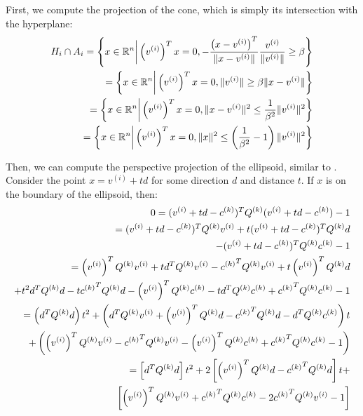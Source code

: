 First, we compute the projection of the cone, which is simply its intersection with the hyperplane:
\begin{align*}
H_i \cap A_i 
= \left\{x \in \mathbb R^n \bigg| \left(v^{(i)}\right)^Tx = 0, -\frac{\left(x - v^{(i)}\right)^T}{\|x - v^{(i)}\|}\frac{v^{(i)}}{\|v^{(i)}\|}\ge \beta \right\} \\
= \left\{x \in \mathbb R^n \bigg| \left(v^{(i)}\right)^Tx = 0, \|v^{(i)}\|\ge \beta\|x - v^{(i)}\| \right\} \\
= \left\{x \in \mathbb R^n \bigg| \left(v^{(i)}\right)^Tx = 0, \|x - v^{(i)}\|^2 \le \frac 1 {\beta^2}\|v^{(i)}\|^2 \right\} \\
= \left\{x \in \mathbb R^n \bigg| \left(v^{(i)}\right)^Tx = 0, \|x\|^2 \le \left(\frac 1 {\beta^2} - 1\right)\|v^{(i)}\|^2 \right\} \\
\end{align*}

Then, we can compute the perspective projection of the ellipsoid, similar to \cite{eberly_2013}.
Consider the point $x = v^{(i)} + td$ for some direction $d$ and distance $t$.
If $x$ is on the boundary of the ellipsoid, then:
\begin{align*}
0 = (v^{(i)} + t d - {c^{(k)}} )^T {Q^{(k)}}  (v^{(i)} + t d - {c^{(k)}} ) - 1\\
= (v^{(i)} + t d - {c^{(k)}} )^T {Q^{(k)}}  v^{(i)} + t (v^{(i)} + t d - {c^{(k)}} )^T {Q^{(k)}} d \\ - (v^{(i)} + t d - {c^{(k)}} )^T {Q^{(k)}} {c^{(k)}} - 1\\
= \left(v^{(i)}\right)^T {Q^{(k)}}  v^{(i)} + t d^T {Q^{(k)}}  v^{(i)} - {c^{(k)}} ^T {Q^{(k)}}  v^{(i)} + t \left(v^{(i)}\right)^T {Q^{(k)}}  d \\ + t^2 d^T {Q^{(k)}}  d - t {c^{(k)}} ^T {Q^{(k)}}  d - \left(v^{(i)}\right)^T {Q^{(k)}}  {c^{(k)}}  - t d^T {Q^{(k)}}  {c^{(k)}} + {c^{(k)}} ^T {Q^{(k)}} {c^{(k)}} - 1\\
= \left(d^T{Q^{(k)}} d
\right) t^2 + \left(
d^T {Q^{(k)}}  v^{(i)} +  \left(v^{(i)}\right)^T {Q^{(k)}}  d - {c^{(k)}} ^T {Q^{(k)}}  d - d^T {Q^{(k)}}  {c^{(k)}} 
\right) t \\ +  \left(
\left(v^{(i)}\right)^T {Q^{(k)}}  v^{(i)} - {c^{(k)}} ^T {Q^{(k)}}  v^{(i)} - \left(v^{(i)}\right)^T {Q^{(k)}}  {c^{(k)}}   + {c^{(k)}} ^T {Q^{(k)}}  {c^{(k)}}  - 1
\right) \\
= \left[d^T{Q^{(k)}} d
\right] t^2 + 2\left[
\left(v^{(i)}\right)^T {Q^{(k)}}  d - {c^{(k)}} ^T{Q^{(k)}} d
\right] t + \\ \left[
\left(v^{(i)}\right)^T {Q^{(k)}}  v^{(i)} + {c^{(k)}} ^T {Q^{(k)}}  {c^{(k)}}  - 2 {c^{(k)}} ^T {Q^{(k)}}  v^{(i)} - 1
\right]
\end{align*}

